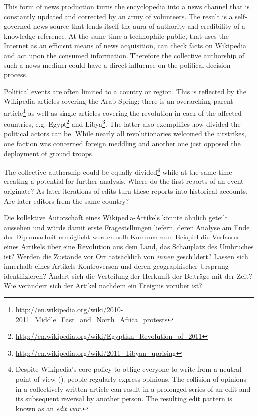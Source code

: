 This form of news production turns the encyclopedia into a news channel that is constantly updated and corrected by an army of volunteers.
The result is a self-governed news source that lends itself the aura of authority and credibility of a knowledge reference.
At the same time a technophile public, that uses the Internet as an efficient means of news acquisition, can check facts on Wikipedia and act upon the consumed information.\cite[p. 424--427]{chadwick2009routledge}
Therefore the collective authorship of such a news medium could have a direct influence on the political decision process.

Political events are often limited to a country or region. 
This is reflected by the Wikipedia articles covering the Arab Spring: there is an overarching parent article\footnote{\url{http://en.wikipedia.org/wiki/2010-2011_Middle_East_and_North_Africa_protests}} as well as single articles covering the revolution in each of the affected countries, e.g. Egypt\footnote{\url{http://en.wikipedia.org/wiki/Egyptian_Revolution_of_2011}} and Libya\footnote{\url{http://en.wikipedia.org/wiki/2011_Libyan_uprising}}.
The latter also exemplifies how divided the political actors can be.
While nearly all revolutionaries welcomed the airstrikes, one faction was concerned foreign meddling and another one just opposed the deployment of ground troops.\cite{econ18290470}

The collective authorship could be equally divided\footnote{Despite Wikipedia's core policy to oblige everyone to write from a neutral point of view (), people regularly express opinions. The collision of opinions in a collectively written article can result in a prolonged series of an edit and its subsequent reversal by another person. The resulting edit pattern is known as an \emph{edit war}.\cite{suh2007us}} while at the same time creating a potential for further analysis.
Where do the first reports of an event originate?
As later iterations of edits turn these reports into historical accounts, Are later editors from the same country?



Die kollektive Autorschaft eines Wikipedia-Artikels könnte ähnlich geteilt aussehen und würde damit erste Fragestellungen liefern, deren Analyse am Ende der Diplomarbeit ermöglicht werden soll:  
Kommen zum Beispiel die Verfasser eines Artikels über eine Revolution aus dem Land, das Schauplatz des Umbruches ist? 
Werden die Zustände vor Ort tatsächlich von \emph{innen} geschildert?
Lassen sich innerhalb eines Artikels Kontroversen und deren geographischer Ursprung identifizieren?
Ändert sich die Verteilung der Herkunft der Beiträge mit der Zeit? 
Wie verändert sich der Artikel nachdem ein Ereignis vorüber ist?

